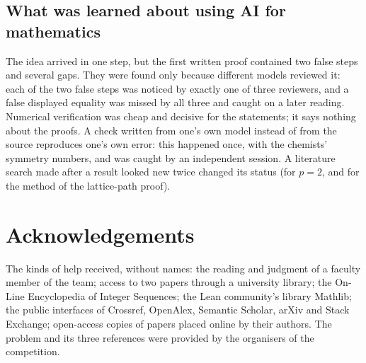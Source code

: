 \documentclass[11pt]{article}
\theoremstyle{definition}
\theoremstyle{remark}
\numberwithin{equation}{section}
\numberwithin{figure}{section}
\begin{document}
\subsection{What was learned about using AI for mathematics}
The idea arrived in one step, but the first written proof contained two false steps and several gaps. They
were found only because different models reviewed it: each of the two false steps was noticed by exactly one
of three reviewers, and a false displayed equality was missed by all three and caught on a later reading.
Numerical verification was cheap and decisive for the statements; it says nothing about the proofs. A check
written from one's own model instead of from the source reproduces one's own error: this happened once, with
the chemists' symmetry numbers, and was caught by an independent session. A literature search made after a
result looked new twice changed its status (for $p=2$, and for the method of the lattice-path proof).

\section*{Acknowledgements}
The kinds of help received, without names: the reading and judgment of a faculty member of the team; access
to two papers through a university library; the On-Line Encyclopedia of Integer Sequences; the Lean
community's library Mathlib; the public interfaces of Crossref, OpenAlex, Semantic Scholar, arXiv and Stack
Exchange; open-access copies of papers placed online by their authors. The problem and its three references
were provided by the organisers of the competition.
\end{document}
